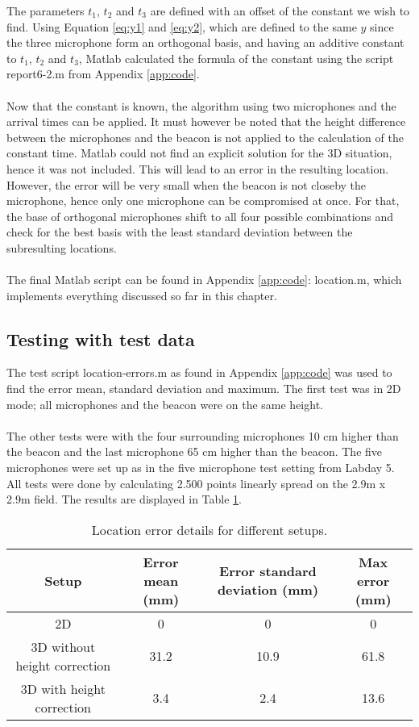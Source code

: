 \documentclass[final]{scrreprt} %
\begin{document}
The parameters $t_1$, $t_2$ and $t_3$ are defined with an offset of the constant we wish to find.
Using Equation \ref{eq:y1} and \ref{eq:y2}, which are defined to the same $y$ since the three microphone form an orthogonal basis, and having an additive constant to $t_1$, $t_2$ and $t_3$, Matlab calculated the formula of the constant using the script report6-2.m from Appendix \ref{app:code}.
\\ \\
Now that the constant is known, the algorithm using two microphones and the arrival times can be applied.
It must however be noted that the height difference between the microphones and the beacon is not applied to the calculation of the constant time.
Matlab could not find an explicit solution for the 3D situation, hence it was not included.
This will lead to an error in the resulting location.
However, the error will be very small when the beacon is not closeby the microphone, hence only one microphone can be compromised at once.
For that, the base of orthogonal microphones shift to all four possible combinations and check for the best basis with the least standard deviation between the subresulting locations.
\\ \\
The final Matlab script can be found in Appendix \ref{app:code}: location.m, which implements everything discussed so far in this chapter.

\subsection{Testing with test data}
\label{sec:testing}
The test script location-errors.m as found in Appendix \ref{app:code} was used to find the error mean, standard deviation and maximum.
The first test was in 2D mode; all microphones and the beacon were on the same height.
\\ \\
The other tests were with the four surrounding microphones 10 cm higher than the beacon and the last microphone 65 cm higher than the beacon.
The five microphones were set up as in the five microphone test setting from Labday 5.
All tests were done by calculating 2.500 points linearly spread on the 2.9m x 2.9m field.
The results are displayed in Table \ref{tab:errors}.

\begin{table} [H]
\centering
	\begin{tabular}{ c | c | c | c }
  	Setup & Error mean (mm) & Error standard deviation (mm) & Max error (mm) \\ \hline
  	2D & 0 & 0 & 0 \\
  	3D without height correction & 31.2 & 10.9 & 61.8 \\
	3D with height correction & 3.4 & 2.4 & 13.6 \\
	\end{tabular}
\caption{Location error details for different setups.}
\label{tab:errors}
\end{table}
\end{document}
